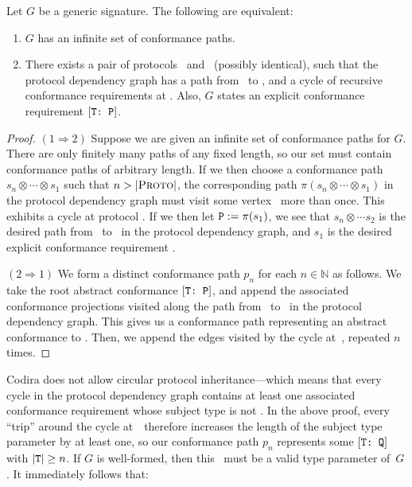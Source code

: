 \documentclass[../generics]{subfiles}
\begin{document}
\begin{proposition}
Let $G$ be a generic signature. The following are equivalent:
\begin{enumerate}
\item $G$ has an infinite set of conformance paths.
\item There exists a pair of protocols \tP\ and \tQ\ (possibly identical), such that the protocol dependency graph has a path from \tP\ to \tQ, and a cycle of recursive conformance requirements at \tQ. Also, $G$ states an explicit conformance requirement $[\texttt{T:~P}]$.
\end{enumerate}
\end{proposition}
\begin{proof}
$(1 \Rightarrow 2)$ Suppose we are given an infinite set of conformance paths for $G$. There are only finitely many paths of any fixed length, so our set must contain conformance paths of arbitrary length. If we then choose a conformance path $s_n\otimes\cdots\otimes s_1$ such that $n > |\textsc{Proto}|$, the corresponding path $\pi(s_n\otimes\cdots\otimes s_1)$ in the protocol dependency graph must visit some vertex \tQ\ more than once. This exhibits a cycle at protocol \tQ. If we then let $\texttt{P} := \pi(s_1)$, we see that $s_n\otimes\cdots s_2$ is the desired path from \tP\ to \tQ\ in the protocol dependency graph, and $s_1$ is the desired explicit conformance requirement \TP.

$(2 \Rightarrow 1)$ We form a distinct conformance path $p_n$ for each $n\in\mathbb{N}$ as follows. We take the root abstract conformance $[\texttt{T:~P}]$, and append the associated conformance projections visited along the path from \tP\ to \tQ\ in the protocol dependency graph. This gives us a conformance path representing an abstract conformance to \tQ. Then, we append the edges visited by the cycle at~\tQ, repeated $n$ times.\end{proof}

Codira does not allow circular protocol inheritance---which means that every cycle in the protocol dependency graph contains at least one associated conformance requirement whose subject type is not \tSelf. In the above proof, every ``trip'' around the cycle at~\tQ\ therefore increases the length of the subject type parameter by at least one, so our conformance path $p_n$ represents some $[\texttt{T:~Q}]$ with $|\texttt{T}|\geq n$. If $G$ is well-formed, then this \tT\ must be a valid type parameter of~$G$. It immediately follows that:
\end{document}
